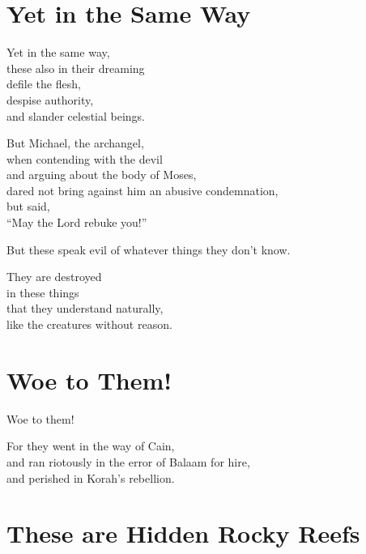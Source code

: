 \documentclass[twoside, openany, 12pt]{extbook}
\newcommand{\tab}[1][0.5cm]{\hspace*{#1}}
\begin{document}
\newpage\section{Yet in the Same Way}

Yet in the same way,
\\
these also in their dreaming
\\
\tab{}
defile the flesh,
\\
\tab{}
despise authority,
\\
\tab{}
and slander celestial beings.

But Michael,
the archangel,
\\
when contending with the devil
\\
and arguing about the body of Moses,
\\
\tab{}
dared not bring against him an abusive condemnation,
\\
but said,
\\
\tab{}
``May the Lord rebuke you!''

But these speak evil of whatever things they don’t know.

They are destroyed
\\
\tab{}
in these things
\\
\tab{}
\tab{}
that they understand naturally,
\\
like the creatures without reason.

\newpage\section{Woe to Them!}

Woe to them!

For they went in the way of Cain,
\\
and ran riotously in the error of Balaam for hire,
\\
and perished in Korah's rebellion.

\newpage\section{These are Hidden Rocky Reefs}
\end{document}
